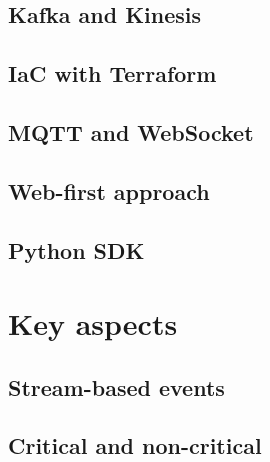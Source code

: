 \subsection{Kafka and Kinesis}
\label{chapter4-kafka-aws-kinesis}

\subsection{IaC with Terraform}
\label{chapter4-iac-with-terraform}

\subsection{MQTT and WebSocket}
\label{chapter4-mqtt-and-websocket}

\subsection{Web-first approach}
\label{chapter4-web-first-approach}

\subsection{Python SDK}
\label{chapter4-python-sdk}

\section{Key aspects}
\label{chapter4-key-aspects}

\subsection{Stream-based events}
\label{chapter4-stream-based-events}

\subsection{Critical and non-critical}
\label{chapter4-critical-and-non-critical}

